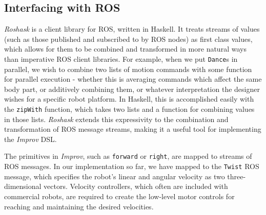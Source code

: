 \documentclass[sigchi-a]{acmart}
\begin{document}
\begin{sidebar}

\section{Interfacing with ROS}\label{interfacing-with-ros}

\emph{Roshask} is a client library for ROS, written in Haskell. It treats streams of values (such as those published
and subscribed to by ROS nodes) as first class values, which allows for them to
be combined and transformed in more natural ways than imperative ROS client
libraries. For example, when we put \texttt{Dance}s in parallel, we wish to combine two
lists of motion commands with some function for parallel execution - whether this
is averaging commands which affect the same body part, or additively combining
them, or whatever interpretation the designer wishes for a specific robot
platform. In Haskell, this is accomplished easily with the
\texttt{zipWith} function, which takes two lists and a function for combining values in
those lists. \emph{Roshask} extends this expressivity to the combination and
transformation of ROS message streams, making it a useful tool for implementing
the \emph{Improv} DSL.

The primitives in \emph{Improv}, such as \texttt{forward} or \texttt{right}, are
mapped to streams of ROS messages. In our implementation so far, we have mapped
to the \texttt{Twist} ROS message, which specifies the robot's linear and
angular velocity as two three-dimensional vectors. Velocity controllers, which
often are included with commercial robots, are required to create the low-level
motor controls for reaching and maintaining the desired velocities. 


\end{sidebar}
\end{document}
